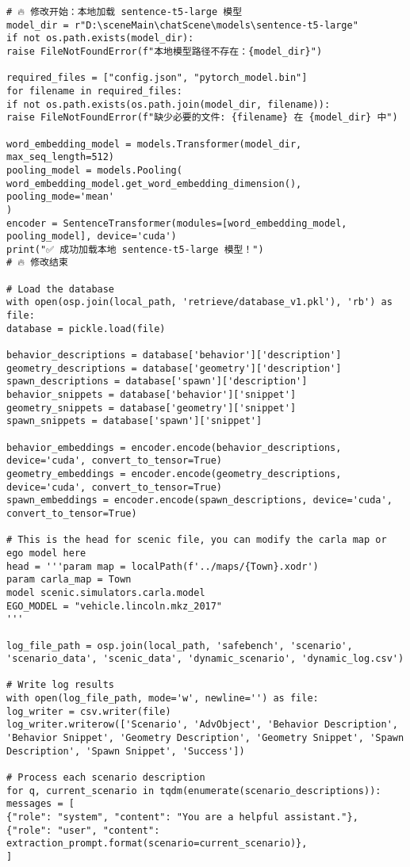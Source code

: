 \begin{enumerate}
\begin{verbatim}
# 🔥 修改开始：本地加载 sentence-t5-large 模型
model_dir = r"D:\sceneMain\chatScene\models\sentence-t5-large"
if not os.path.exists(model_dir):
raise FileNotFoundError(f"本地模型路径不存在：{model_dir}")

required_files = ["config.json", "pytorch_model.bin"]
for filename in required_files:
if not os.path.exists(os.path.join(model_dir, filename)):
raise FileNotFoundError(f"缺少必要的文件: {filename} 在 {model_dir} 中")

word_embedding_model = models.Transformer(model_dir, max_seq_length=512)
pooling_model = models.Pooling(
word_embedding_model.get_word_embedding_dimension(),
pooling_mode='mean'
)
encoder = SentenceTransformer(modules=[word_embedding_model, pooling_model], device='cuda')
print("✅ 成功加载本地 sentence-t5-large 模型！")
# 🔥 修改结束

# Load the database
with open(osp.join(local_path, 'retrieve/database_v1.pkl'), 'rb') as file:
database = pickle.load(file)

behavior_descriptions = database['behavior']['description']
geometry_descriptions = database['geometry']['description']
spawn_descriptions = database['spawn']['description']
behavior_snippets = database['behavior']['snippet']
geometry_snippets = database['geometry']['snippet']
spawn_snippets = database['spawn']['snippet']

behavior_embeddings = encoder.encode(behavior_descriptions, device='cuda', convert_to_tensor=True)
geometry_embeddings = encoder.encode(geometry_descriptions, device='cuda', convert_to_tensor=True)
spawn_embeddings = encoder.encode(spawn_descriptions, device='cuda', convert_to_tensor=True)

# This is the head for scenic file, you can modify the carla map or ego model here
head = '''param map = localPath(f'../maps/{Town}.xodr') 
param carla_map = Town
model scenic.simulators.carla.model
EGO_MODEL = "vehicle.lincoln.mkz_2017"
'''

log_file_path = osp.join(local_path, 'safebench', 'scenario', 'scenario_data', 'scenic_data', 'dynamic_scenario', 'dynamic_log.csv')

# Write log results
with open(log_file_path, mode='w', newline='') as file:
log_writer = csv.writer(file)
log_writer.writerow(['Scenario', 'AdvObject', 'Behavior Description', 'Behavior Snippet', 'Geometry Description', 'Geometry Snippet', 'Spawn Description', 'Spawn Snippet', 'Success'])

# Process each scenario description
for q, current_scenario in tqdm(enumerate(scenario_descriptions)):
messages = [
{"role": "system", "content": "You are a helpful assistant."},
{"role": "user", "content": extraction_prompt.format(scenario=current_scenario)},
]


\end{verbatim}
\end{enumerate}

